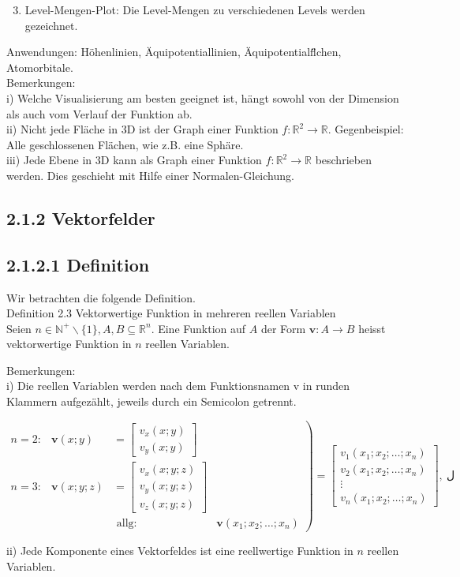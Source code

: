 \documentclass[10pt]{article}
\begin{document}
\begin{enumerate}
  \setcounter{enumi}{2}
  \item Level-Mengen-Plot: Die Level-Mengen zu verschiedenen Levels werden gezeichnet.
\end{enumerate}

Anwendungen: Höhenlinien, Äquipotentiallinien, Äquipotentialfl̈̈chen, Atomorbitale.\\
Bemerkungen:\\
i) Welche Visualisierung am besten geeignet ist, hängt sowohl von der Dimension als auch vom Verlauf der Funktion ab.\\
ii) Nicht jede Fläche in 3D ist der Graph einer Funktion $f: \mathbb{R}^{2} \rightarrow \mathbb{R}$. Gegenbeispiel: Alle geschlossenen Flächen, wie z.B. eine Sphäre.\\
iii) Jede Ebene in 3D kann als Graph einer Funktion $f: \mathbb{R}^{2} \rightarrow \mathbb{R}$ beschrieben werden. Dies geschieht mit Hilfe einer Normalen-Gleichung.

\subsection*{2.1.2 Vektorfelder}
\subsection*{2.1.2.1 Definition}
Wir betrachten die folgende Definition.\\
Definition 2.3 Vektorwertige Funktion in mehreren reellen Variablen\\
Seien $n \in \mathbb{N}^{+} \backslash\{1\}, A, B \subseteq \mathbb{R}^{n}$. Eine Funktion auf $A$ der Form $\mathbf{v}: A \rightarrow B$ heisst vektorwertige Funktion in $n$ reellen Variablen.

Bemerkungen:\\
i) Die reellen Variablen werden nach dem Funktionsnamen v in runden Klammern aufgezählt, jeweils durch ein Semicolon getrennt.

\[
\left.\begin{array}{rlrl}
n=2: & \mathbf{v}(x ; y) & =\left[\begin{array}{c}
v_{x}(x ; y) \\
v_{y}(x ; y)
\end{array}\right] \\
n=3: & \mathbf{v}(x ; y ; z) & =\left[\begin{array}{c}
v_{x}(x ; y ; z) \\
v_{y}(x ; y ; z) \\
v_{z}(x ; y ; z)
\end{array}\right] \\
& & \text { allg: } & \mathbf{v}\left(x_{1} ; x_{2} ; \ldots ; x_{n}\right)
\end{array}\right)=\left[\begin{array}{c}
v_{1}\left(x_{1} ; x_{2} ; \ldots ; x_{n}\right)  \tag{2.20}\\
v_{2}\left(x_{1} ; x_{2} ; \ldots ; x_{n}\right) \\
\vdots \\
v_{n}\left(x_{1} ; x_{2} ; \ldots ; x_{n}\right)
\end{array}\right], ~ ل
\]

ii) Jede Komponente eines Vektorfeldes ist eine reellwertige Funktion in $n$ reellen Variablen.
\end{document}
